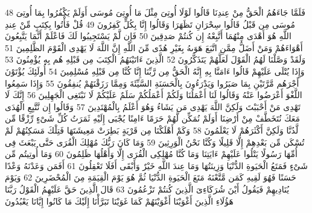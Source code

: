 \documentclass[20pt,a4paper]{article}
\begin{document}
{\tiny\colorbox{cl_aya}{48}} فَلَمَّا جَاءَهُمُ الْحَقُّ مِنْ عِندِنَا قَالُوا لَوْلَا أُوتِىَ مِثْلَ مَا أُوتِىَ مُوسَى أَوَلَمْ يَكْفُرُوا بِمَا أُوتِىَ مُوسَى مِن قَبْلُ قَالُوا سِحْرَانِ تَظَهَرَا وَقَالُوا إِنَّا بِكُلٍّ كَفِرُونَ
{\tiny\colorbox{cl_aya}{49}} قُلْ فَأْتُوا بِكِتَبٍ مِّنْ عِندِ اللَّهِ هُوَ أَهْدَى مِنْهُمَا أَتَّبِعْهُ إِن كُنتُمْ صَدِقِينَ
{\tiny\colorbox{cl_aya}{50}} فَإِن لَّمْ يَسْتَجِيبُوا لَكَ فَاعْلَمْ أَنَّمَا يَتَّبِعُونَ أَهْوَاءَهُمْ وَمَنْ أَضَلُّ مِمَّنِ اتَّبَعَ هَوَىهُ بِغَيْرِ هُدًى مِّنَ اللَّهِ إِنَّ اللَّهَ لَا يَهْدِى الْقَوْمَ الظَّلِمِينَ
{\tiny\colorbox{cl_aya}{51}} وَلَقَدْ وَصَّلْنَا لَهُمُ الْقَوْلَ لَعَلَّهُمْ يَتَذَكَّرُونَ
{\tiny\colorbox{cl_aya}{52}} الَّذِينَ ءَاتَيْنَهُمُ الْكِتَبَ مِن قَبْلِهِ هُم بِهِ يُؤْمِنُونَ
{\tiny\colorbox{cl_aya}{53}} وَإِذَا يُتْلَى عَلَيْهِمْ قَالُوا ءَامَنَّا بِهِ إِنَّهُ الْحَقُّ مِن رَّبِّنَا إِنَّا كُنَّا مِن قَبْلِهِ مُسْلِمِينَ
{\tiny\colorbox{cl_aya}{54}} أُولَئِكَ يُؤْتَوْنَ أَجْرَهُم مَّرَّتَيْنِ بِمَا صَبَرُوا وَيَدْرَءُونَ بِالْحَسَنَةِ السَّيِّئَةَ وَمِمَّا رَزَقْنَهُمْ يُنفِقُونَ
{\tiny\colorbox{cl_aya}{55}} وَإِذَا سَمِعُوا اللَّغْوَ أَعْرَضُوا عَنْهُ وَقَالُوا لَنَا أَعْمَلُنَا وَلَكُمْ أَعْمَلُكُمْ سَلَمٌ عَلَيْكُمْ لَا نَبْتَغِى الْجَهِلِينَ
{\tiny\colorbox{cl_aya}{56}} إِنَّكَ لَا تَهْدِى مَنْ أَحْبَبْتَ وَلَكِنَّ اللَّهَ يَهْدِى مَن يَشَاءُ وَهُوَ أَعْلَمُ بِالْمُهْتَدِينَ
{\tiny\colorbox{cl_aya}{57}} وَقَالُوا إِن نَّتَّبِعِ الْهُدَى مَعَكَ نُتَخَطَّفْ مِنْ أَرْضِنَا أَوَلَمْ نُمَكِّن لَّهُمْ حَرَمًا ءَامِنًا يُجْبَى إِلَيْهِ ثَمَرَتُ كُلِّ شَىْءٍ رِّزْقًا مِّن لَّدُنَّا وَلَكِنَّ أَكْثَرَهُمْ لَا يَعْلَمُونَ
{\tiny\colorbox{cl_aya}{58}} وَكَمْ أَهْلَكْنَا مِن قَرْيَةٍ بَطِرَتْ مَعِيشَتَهَا فَتِلْكَ مَسَكِنُهُمْ لَمْ تُسْكَن مِّن بَعْدِهِمْ إِلَّا قَلِيلًا وَكُنَّا نَحْنُ الْوَرِثِينَ
{\tiny\colorbox{cl_aya}{59}} وَمَا كَانَ رَبُّكَ مُهْلِكَ الْقُرَى حَتَّى يَبْعَثَ فِى أُمِّهَا رَسُولًا يَتْلُوا عَلَيْهِمْ ءَايَتِنَا وَمَا كُنَّا مُهْلِكِى الْقُرَى إِلَّا وَأَهْلُهَا ظَلِمُونَ
{\tiny\colorbox{cl_aya}{60}} وَمَا أُوتِيتُم مِّن شَىْءٍ فَمَتَعُ الْحَيَوةِ الدُّنْيَا وَزِينَتُهَا وَمَا عِندَ اللَّهِ خَيْرٌ وَأَبْقَى أَفَلَا تَعْقِلُونَ
{\tiny\colorbox{cl_aya}{61}} أَفَمَن وَعَدْنَهُ وَعْدًا حَسَنًا فَهُوَ لَقِيهِ كَمَن مَّتَّعْنَهُ مَتَعَ الْحَيَوةِ الدُّنْيَا ثُمَّ هُوَ يَوْمَ الْقِيَمَةِ مِنَ الْمُحْضَرِينَ
{\tiny\colorbox{cl_aya}{62}} وَيَوْمَ يُنَادِيهِمْ فَيَقُولُ أَيْنَ شُرَكَاءِىَ الَّذِينَ كُنتُمْ تَزْعُمُونَ
{\tiny\colorbox{cl_aya}{63}} قَالَ الَّذِينَ حَقَّ عَلَيْهِمُ الْقَوْلُ رَبَّنَا هَؤُلَاءِ الَّذِينَ أَغْوَيْنَا أَغْوَيْنَهُمْ كَمَا غَوَيْنَا تَبَرَّأْنَا إِلَيْكَ مَا كَانُوا إِيَّانَا يَعْبُدُونَ
\end{document}
